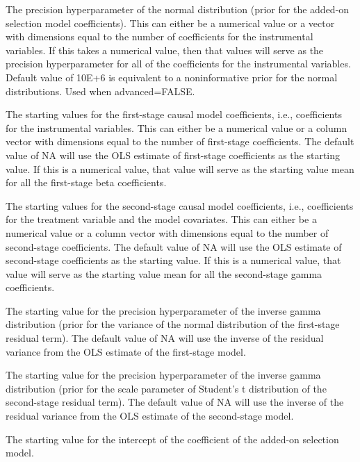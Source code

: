 \documentclass[a4paper]{book}
\begin{document}
\begin{Arguments}
\begin{ldescription}
\item[\code{L0}] The precision hyperparameter of the normal distribution (prior for the added-on selection model coefficients).
This can either be a numerical value or a vector with dimensions equal to the number of coefficients for the instrumental variables.
If this takes a numerical value, then that values will serve as the precision hyperparameter for all of the coefficients
for the instrumental variables. Default value of 10E+6 is equivalent to a noninformative prior for the normal distributions.
Used when advanced=FALSE.

\item[\code{beta.start}] The starting values for the first-stage causal model coefficients,
i.e., coefficients for the instrumental variables.
This can either be a numerical value or a column vector with dimensions
equal to the number of first-stage coefficients.
The default value of NA will use the OLS estimate of first-stage coefficients as the starting value.
If this is a numerical value, that value will
serve as the starting value mean for all the first-stage beta coefficients.

\item[\code{gamma.start}] The starting values for the second-stage causal model coefficients,
i.e., coefficients for the treatment variable and the model covariates.
This can either be a numerical value or a column vector with dimensions
equal to the number of second-stage coefficients.
The default value of NA will use the OLS estimate of second-stage coefficients as the starting value.
If this is a numerical value, that value will
serve as the starting value mean for all the second-stage gamma coefficients.

\item[\code{u.start}] The starting value for the precision hyperparameter of the inverse gamma distribution
(prior for the variance of the normal distribution of the first-stage residual term).
The default value of NA will use the inverse of the residual variance from the OLS estimate of the first-stage model.

\item[\code{e.start}] The starting value for the precision hyperparameter of the inverse gamma distribution
(prior for the scale parameter of Student's t distribution of the second-stage residual term).
The default value of NA will use the inverse of the residual variance from the OLS estimate
of the second-stage model.

\item[\code{lambda0.start}] The starting value for the intercept of the coefficient of the added-on selection model.


\end{ldescription}
\end{Arguments}
\end{document}
